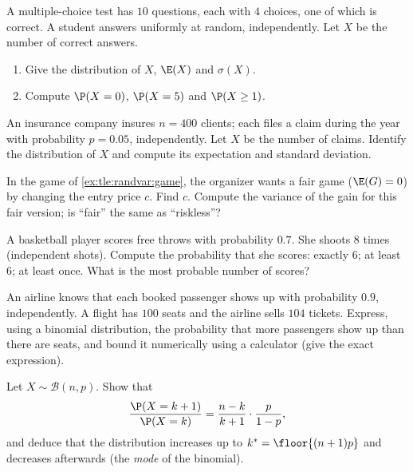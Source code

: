 \begin{exercise}[$\star$]\label{exo:tle:randvar:2}
A multiple-choice test has $10$ questions, each with $4$ choices, one of
which is correct. A student answers uniformly at random, independently.
Let $X$ be the number of correct answers.
\begin{enumerate}
  \item Give the distribution of $X$, $\E(X)$ and $\sigma(X)$.
  \item Compute $\P(X = 0)$, $\P(X = 5)$ and $\P(X \geq 1)$.
\end{enumerate}
\end{exercise}

\begin{exercise}[$\star$]\label{exo:tle:randvar:3}
An insurance company insures $n = 400$ clients; each files a claim during
the year with probability $p = 0.05$, independently. Let $X$ be the number
of claims. Identify the distribution of $X$ and compute its expectation and
standard deviation.
\end{exercise}

\begin{exercise}[$\star\star$]\label{exo:tle:randvar:4}
In the game of \cref{ex:tle:randvar:game}, the organizer wants a fair game
($\E(G) = 0$) by changing the entry price $c$. Find $c$. Compute the
variance of the gain for this fair version; is ``fair'' the same as
``riskless''?
\end{exercise}

\begin{exercise}[$\star\star$]\label{exo:tle:randvar:5}
A basketball player scores free throws with probability $0.7$. She shoots
$8$ times (independent shots). Compute the probability that she scores:
exactly $6$; at least $6$; at least once. What is the most probable number
of scores?
\end{exercise}

\begin{exercise}[$\star\star$]\label{exo:tle:randvar:6}
An airline knows that each booked passenger shows up with probability
$0.9$, independently. A flight has $100$ seats and the airline sells $104$
tickets. Express, using a binomial distribution, the probability that more
passengers show up than there are seats, and bound it numerically using a
calculator (give the exact expression).
\end{exercise}

\begin{exercise}[$\star\star$]\label{exo:tle:randvar:7}
Let $X \sim \mathcal B(n, p)$. Show that
\[
\frac{\P(X = k+1)}{\P(X = k)} = \frac{n-k}{k+1}\cdot\frac{p}{1-p},
\]
and deduce that the distribution increases up to
$k^* = \floor{(n+1)p}$ and decreases afterwards (the \emph{mode} of the
binomial).
\end{exercise}

